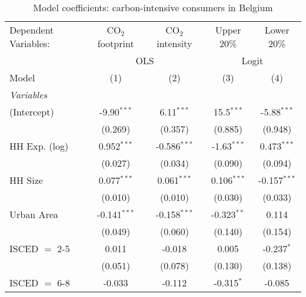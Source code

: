 
\begin{table}[htbp!]
   \centering
   \small
   \begin{adjustbox}{width = 1\textwidth, max height = 0.95\textheight, center}
      \begin{threeparttable}[b]
         \caption{\label{tab:Logit_1_BEL} Model coefficients: carbon-intensive consumers in Belgium}
         \begin{tabular}{lcccc}
            \tabularnewline \midrule \midrule
            Dependent Variables: & CO$_{2}$ footprint & CO$_{2}$ intensity & Upper 20\%    & Lower 20\%\\   
             & \multicolumn{2}{c}{OLS} & \multicolumn{2}{c}{Logit} \\ 
            Model                & (1)                & (2)                & (3)           & (4)\\  
            \midrule
            \emph{Variables}\\
            (Intercept)          & -9.90$^{***}$      & 6.11$^{***}$       & 15.5$^{***}$  & -5.88$^{***}$\\   
                                 & (0.269)            & (0.357)            & (0.885)       & (0.948)\\   
            HH Exp. (log)        & 0.952$^{***}$      & -0.586$^{***}$     & -1.63$^{***}$ & 0.473$^{***}$\\   
                                 & (0.027)            & (0.034)            & (0.090)       & (0.094)\\   
            HH Size              & 0.077$^{***}$      & 0.061$^{***}$      & 0.106$^{***}$ & -0.157$^{***}$\\   
                                 & (0.010)            & (0.010)            & (0.030)       & (0.033)\\   
            Urban Area           & -0.141$^{***}$     & -0.158$^{***}$     & -0.323$^{**}$ & 0.114\\   
                                 & (0.049)            & (0.060)            & (0.140)       & (0.154)\\   
            ISCED $=$ 2-5        & 0.011              & -0.018             & 0.005         & -0.237$^{*}$\\   
                                 & (0.051)            & (0.078)            & (0.130)       & (0.138)\\   
            ISCED $=$ 6-8        & -0.033             & -0.112             & -0.315$^{*}$  & -0.085\\   

\end{tabular}
\end{threeparttable}
\end{adjustbox}
\end{table}
